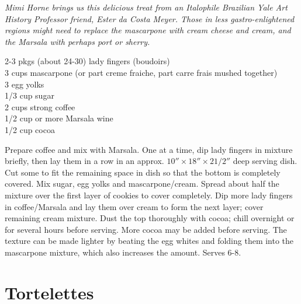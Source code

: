 \textit{Mimi Horne brings us this delicious treat from an
Italophile Brazilian Yale Art History Professor friend, Ester da Costa Meyer.
Those in less gastro-enlightened regions might need to replace the mascarpone
with cream cheese and cream, and the Marsala with perhaps port or sherry. }
\begin{ingredients}
2-3 pkgs (about 24-30) lady fingers (boudoirs) \\
3 cups mascarpone (or part creme fraiche, part carre frais mushed together)\\
3 egg yolks \\
1/3 cup sugar \\
2 cups strong coffee \\
1/2 cup or more Marsala wine \\
1/2 cup cocoa
\end{ingredients}
Prepare coffee and mix with Marsala. One at a time, dip lady fingers in mixture
briefly, then lay them in a row in an approx. $10''\times 18''\times 2 1/2''$
deep serving dish.
Cut some to fit the remaining space in dish so that the bottom is
completely covered. Mix sugar, egg yolks and mascarpone/cream. Spread
about half the mixture over the first layer of cookies to cover completely.
Dip more lady fingers in coffee/Marsala and lay them over cream to form the
next layer; cover remaining cream mixture. Dust the top thoroughly with cocoa;
chill overnight or for several hours before serving. More cocoa may be added
before serving. The texture can be made lighter by beating the egg whites and
folding them into the mascarpone mixture, which also increases the amount.
Serves 6-8.

\section{Tortelettes}

